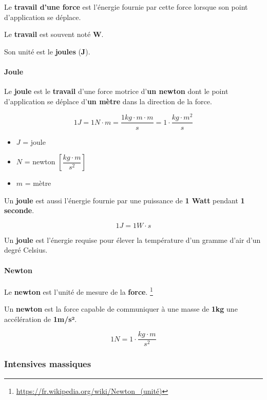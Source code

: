 \documentclass[]{article}
\providecommand{\tightlist}{%
  \setlength{\itemsep}{0pt}\setlength{\parskip}{0pt}}
\let\oldparagraph\paragraph
\renewcommand{\paragraph}[1]{\oldparagraph{#1}\mbox{}}
\begin{document}
Le \textbf{travail d’une force} est l’énergie fournie par cette force
lorsque son point d’application se déplace.

Le \textbf{travail} est souvent noté \textbf{W}.

Son unité est le \textbf{joules} (\textbf{J}).

\paragraph{Joule}\label{joule}

Le \textbf{joule} est le \textbf{travail} d’une force motrice
d’\textbf{un newton} dont le point d’application se déplace d’\textbf{un
mètre} dans la direction de la force.

$$ 1 J = 1 N \cdot m = \dfrac{ 1 kg \cdot m \cdot m }{ s } = 1 \cdot \dfrac { kg \cdot m^2}{ s }  $$

\begin{itemize}
\tightlist
\item
  $J$ = joule
\item
  $N$ = newton $ \left[ \dfrac{kg \cdot m}{s^2} \right] $
\item
  $m$ = mètre \\
\end{itemize}


Un \textbf{joule} est aussi l’énergie fournie par une puissance de
\textbf{1 Watt} pendant \textbf{1 seconde}.

$$ 1 J = 1 W \cdot s $$

Un \textbf{joule} est l’énergie requise pour élever la température d’un
gramme d’air d’un degré Celsius.

\paragraph{Newton}\label{newton}

Le \textbf{newton} est l’unité de mesure de la \textbf{force}. \footnote{\url{https://fr.wikipedia.org/wiki/Newton\_(unité)}}

Un \textbf{newton} est la force capable de communiquer à une masse de
\textbf{1kg} une accélération de \textbf{1m/s²}.

$$ 1 N = 1 \cdot \dfrac{kg \cdot m}{s^2} $$



\subsubsection{Intensives massiques}\label{intensives-massiques}
\end{document}
